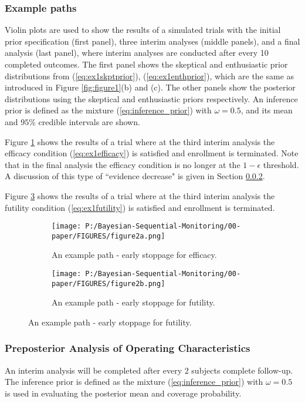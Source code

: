 \documentclass[12pt]{article}
\begin{document}
\subsubsection{Example paths}
Violin plots are used to show the results of a simulated trials with the initial prior specification (first panel), three interim analyses (middle panels), and a final analysis (last panel), where interim analyses are conducted after every 10 completed outcomes. The first panel shows the skeptical and enthusiastic prior distributions from (\ref{eq:ex1skptprior}), (\ref{eq:ex1enthprior}), which are the same as introduced in Figure \ref{fig:figure1}(b) and (c). The other panels show the posterior distributions using the skeptical and enthusiastic priors respectively. An inference prior is defined as the mixture (\ref{eq:inference_prior}) with $\omega=0.5$, and its mean and $95\%$ credible intervals are shown.

Figure \ref{fig:figure2a} shows the results of a trial where at the third interim analysis the efficacy condition (\ref{eq:ex1efficacy}) is satisfied and enrollment is terminated. Note that in the final analysis the efficacy condition is no longer at the $1-\epsilon$ threshold. A discussion of this type of ``evidence decrease" is given in Section \ref{sec:ex1operatingcharacteristics}.

Figure \ref{fig:figure2b} shows the results of a trial where at the third interim analysis the futility condition (\ref{eq:ex1futility}) is satisfied and enrollment is terminated. 
\begin{figure}
  \begin{subfigure}{7in}
    \centering\texttt{[image: P:/Bayesian-Sequential-Monitoring/00-paper/FIGURES/figure2a.png]}
    \caption{An example path - early stoppage for efficacy.}
	\label{fig:figure2a}
  \end{subfigure}
  \begin{subfigure}{7in}
    \centering\texttt{[image: P:/Bayesian-Sequential-Monitoring/00-paper/FIGURES/figure2b.png]}
    \caption{An example path - early stoppage for futility.}
	\label{fig:figure2b}
  \end{subfigure}
 
\end{figure}
\newpage
\subsubsection{Preposterior Analysis of Operating Characteristics}\label{sec:ex1operatingcharacteristics}
An interim analysis will be completed after every 2 subjects complete follow-up. The inference prior is defined as the mixture (\ref{eq:inference_prior}) with $\omega=0.5$ is used in evaluating the posterior mean and coverage probability.
\end{document}

